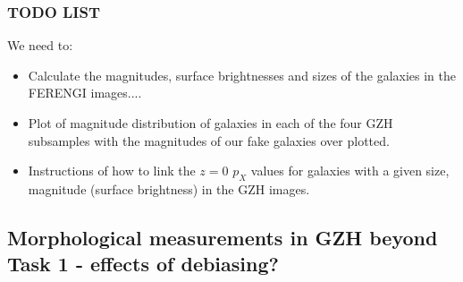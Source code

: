 \documentclass[twocolumn]{aastex6}
\begin{document}
%
%
%
%
%
%
%


\subsubsection{TODO LIST}
We need to: 
\begin{itemize}
\item Calculate the magnitudes, surface brightnesses and sizes of the galaxies in the FERENGI images....
\item Plot of magnitude distribution of galaxies in each of the four GZH subsamples with the magnitudes of our fake galaxies over plotted. 
\item Instructions of how to link the $z=0$ $p_X$ values for galaxies with a given size, magnitude (surface brightness) in the GZH images. 
\end{itemize}

\subsection{Morphological measurements in GZH beyond Task 1 - effects of debiasing?}
\end{document}
